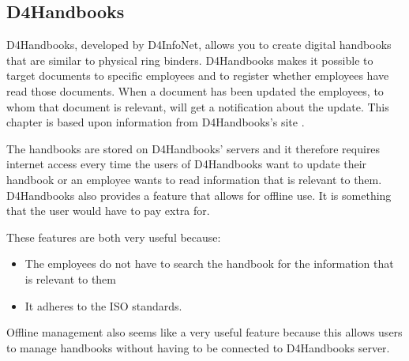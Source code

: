 \subsection{D4Handbooks}
D4Handbooks, developed by D4InfoNet, allows you to create digital handbooks that are similar to physical ring binders.
D4Handbooks makes it possible to target documents to specific employees and to register whether employees have read those documents.
When a document has been updated the employees, to whom that document is relevant, will get a notification about the update.
This chapter is based upon information from D4Handbooks's site \cite{D4Hanbook}.

The handbooks are stored on D4Handbooks' servers and it therefore requires internet access every time the users of D4Handbooks want to update their handbook or an employee wants to read information that is relevant to them.
D4Handbooks also provides a feature that allows for offline use. It is something that the user would have to pay extra for.

These features are both very useful because:

\begin{itemize}
        \item
        The employees do not have to search the handbook for the information that is relevant to them
        \item
        It adheres to the ISO standards.
\end{itemize}

Offline management also seems like a very useful feature because this allows users to manage handbooks without having to be connected to D4Handbooks server.
